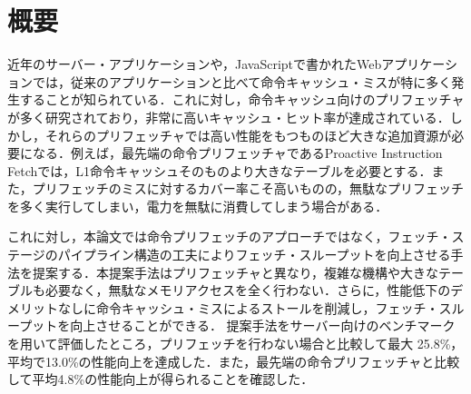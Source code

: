 
\chapter*{概要}
近年のサーバー・アプリケーションや，JavaScriptで書かれたWebアプリケーションでは，従来のアプリケーションと比べて命令キャッシュ・ミスが特に多く発生することが知られている．これに対し，命令キャッシュ向けのプリフェッチャが多く研究されており，非常に高いキャッシュ・ヒット率が達成されている．しかし，それらのプリフェッチャでは高い性能をもつものほど大きな追加資源が必要になる．例えば，最先端の命令プリフェッチャであるProactive Instruction Fetchでは，L1命令キャッシュそのものより大きなテーブルを必要とする．また，プリフェッチのミスに対するカバー率こそ高いものの，無駄なプリフェッチを多く実行してしまい，電力を無駄に消費してしまう場合がある．

これに対し，本論文では命令プリフェッチのアプローチではなく，フェッチ・ステージのパイプライン構造の工夫によりフェッチ・スループットを向上させる手法を提案する．本提案手法はプリフェッチャと異なり，複雑な機構や大きなテーブルも必要なく，無駄なメモリアクセスを全く行わない．さらに，性能低下のデメリットなしに命令キャッシュ・ミスによるストールを削減し，フェッチ・スループットを向上させることができる．
提案手法をサーバー向けのベンチマークを用いて評価したところ，プリフェッチを行わない場合と比較して最大 25.8\%，平均で13.0\%の性能向上を達成した．また，最先端の命令プリフェッチャと比較して平均4.8\%の性能向上が得られることを確認した．
